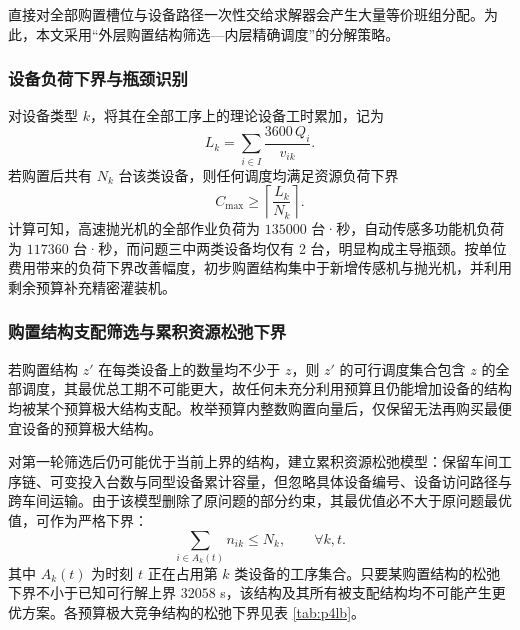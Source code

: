 \documentclass[12pt,a4paper]{article}
\begin{document}
直接对全部购置槽位与设备路径一次性交给求解器会产生大量等价班组分配。为此，本文采用“外层购置结构筛选—内层精确调度”的分解策略。

\subsubsection{设备负荷下界与瓶颈识别}

对设备类型 $k$，将其在全部工序上的理论设备工时累加，记为
\begin{equation}
L_k=\sum_{i\in I}\frac{3600\,Q_i}{v_{ik}} .
\label{eq:p4loaddef}
\end{equation}
若购置后共有 $N_k$ 台该类设备，则任何调度均满足资源负荷下界
\begin{equation}
C_{\max}\ge \left\lceil\frac{L_k}{N_k}\right\rceil .
\label{eq:p4load}
\end{equation}
计算可知，高速抛光机的全部作业负荷为 $135000$ 台·秒，自动传感多功能机负荷为 $117360$ 台·秒，而问题三中两类设备均仅有 2 台，明显构成主导瓶颈。按单位费用带来的负荷下界改善幅度，初步购置结构集中于新增传感机与抛光机，并利用剩余预算补充精密灌装机。

\subsubsection{购置结构支配筛选与累积资源松弛下界}

若购置结构 $z'$ 在每类设备上的数量均不少于 $z$，则 $z'$ 的可行调度集合包含 $z$ 的全部调度，其最优总工期不可能更大，故任何未充分利用预算且仍能增加设备的结构均被某个预算极大结构支配。枚举预算内整数购置向量后，仅保留无法再购买最便宜设备的预算极大结构。

对第一轮筛选后仍可能优于当前上界的结构，建立累积资源松弛模型：保留车间工序链、可变投入台数与同型设备累计容量，但忽略具体设备编号、设备访问路径与跨车间运输。由于该模型删除了原问题的部分约束，其最优值必不大于原问题最优值，可作为严格下界：
\begin{equation}
\sum_{i\in A_k(t)} n_{ik}\le N_k,\qquad \forall k,t .
\label{eq:p4relax}
\end{equation}
其中 $A_k(t)$ 为时刻 $t$ 正在占用第 $k$ 类设备的工序集合。只要某购置结构的松弛下界不小于已知可行解上界 $32058$ s，该结构及其所有被支配结构均不可能产生更优方案。各预算极大竞争结构的松弛下界见表 \ref{tab:p4lb}。
\end{document}
